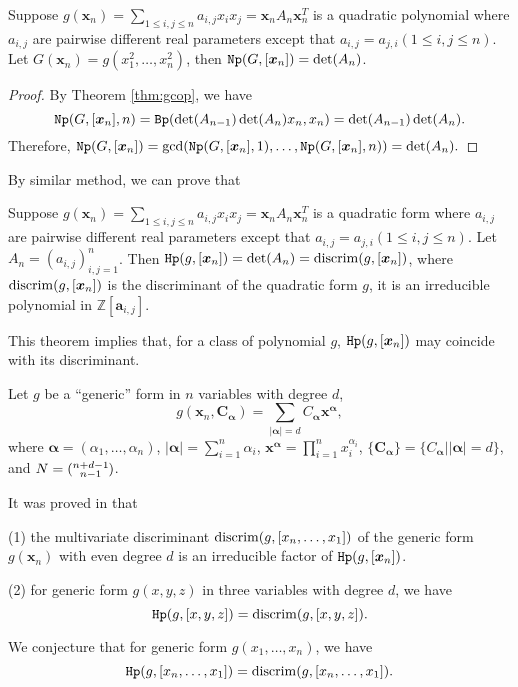 \documentclass[amsthm]{elsart}
\def \discrim  {{\rm discrim}}
\def \Bproj  {{\tt Bp}}
\def  \Nproj {{\tt Np}}
\def  \Hproj {{\tt Hp}}
\def \ZZ {{\mathbb Z}}
\newcommand{\xx}{\bm{x}}
\begin{document}
\begin{thm}
Suppose $g(\xx_{n})=\sum_{1\le i,j\le n} a_{i,j}x_ix_j=\xx_{n}A_{n}\xx_{n}^T$ is a quadratic polynomial
        where $a_{i,j}$ are pairwise different real parameters except that $a_{i,j}=a_{j,i} (1\le i,j\le n)$. Let $G(\xx_n)=g(x_1^2,\ldots,x_n^2)$, then $\Nproj(G,[\xx_n])=\det(A_{n})$. \end{thm}
\begin{proof}
By Theorem \ref{thm:gcop}, we have
$$\Nproj(G,[\xx_n],n)=\Bproj(\det(A_{n-1})\det(A_n)x_n,x_{n})=\det(A_{n-1})\det(A_n).$$
Therefore,
        $\Nproj(G,[\xx_n])=\gcd(\Nproj(G,[\xx_n],1 ),\ldots,\Nproj(G,[\xx_n],n))=\det(A_{n}).$
\end{proof}
By similar method, we can prove that
\begin{thm}
Suppose $g(\xx_{n})=\sum_{1\le i,j\le n} a_{i,j}x_ix_j=\xx_{n}A_{n}\xx_{n}^T$ is a quadratic form
        where $a_{i,j}$ are pairwise different real parameters except that $a_{i,j}=a_{j,i} (1\le i,j\le n)$. Let $A_{n}=(a_{i,j})_{i,j=1}^{n}$. Then $\Hproj(g,[\xx_n])=\det(A_{n})=\discrim(g,[\xx_n])$, where $\discrim(g,[\xx_n])$ is the discriminant of the quadratic form $g$, it is an irreducible polynomial in $\ZZ[\bm{a}_{i,j}]$.
\end{thm}
This theorem implies that, for a class of polynomial $g$, $\Hproj(g,[\xx_n])$ may coincide with its discriminant.

Let $g$ be a ``generic'' form in $n$ variables with degree $d$,
$$g(\xx_n,\bm{C}_{\bm{\alpha}})=\sum_{|\bm{\alpha}|=d}C_{\bm{\alpha}}\bm {x}^{\bm{\alpha}},$$
where $\bm{\alpha}=(\alpha_1,\ldots,\alpha_n)$, $|\bm{\alpha}|=\sum_{i=1}^n \alpha_i$, $\bm {x}^{\bm{\alpha}}=\prod_{i=1}^n x_i^{\alpha_i}$, $\{\bm{C}_{\bm{\alpha}}\}=\{C_{\bm{\alpha}}||\bm{\alpha}|=d\}$, and $N=(\begin{subarray}{c}n+d-1\\n-1 \end{subarray})$.

It was proved in \cite{han2016multivariate} that

(1) the multivariate discriminant $\discrim(g,[x_n,\ldots,x_1])$ of the generic form $g(\xx_n)$ with even degree $d$ is an irreducible factor of $\Hproj(g,[\xx_n])$.

(2) for generic form $g(x,y,z)$ in three variables with degree $d$, we have
  $$\Hproj(g,[x,y,z])=\discrim(g,[x,y,z]).$$

We conjecture that for generic form $g(x_1,\ldots,x_n)$, we have
  $$\Hproj(g,[x_n,\ldots,x_1])=\discrim(g,[x_n,\ldots,x_1]).$$
\end{document}
